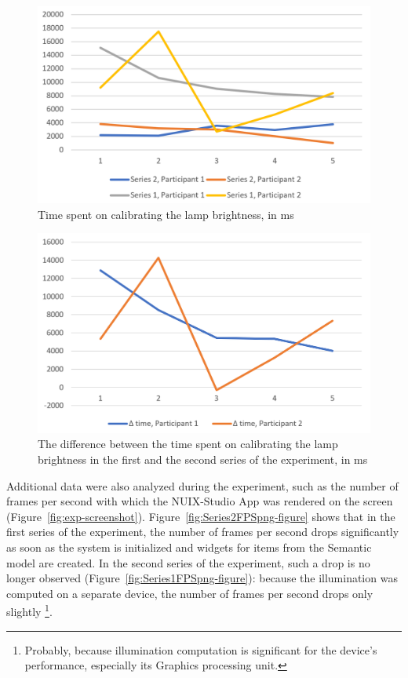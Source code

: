 \begin{figure}
  \centering
  \includegraphics[width = 0.9 \linewidth]{figures/ExperimentTime.png}
  \caption{Time spent on calibrating the lamp brightness, in ms}
  \label{fig:ExperimentTime-figure}
\end{figure}


\begin{figure}
  \centering
  \includegraphics[width = 0.9 \linewidth]{figures/DeltaTime.png}
  \caption{The difference between the time spent on calibrating the lamp brightness in the first and the second series of the experiment, in ms}
  \label{fig:DeltaTime-figure}
\end{figure}

Additional data were also analyzed during the experiment, such as the number of frames per second with which the NUIX-Studio App was rendered on the screen (Figure~\ref{fig:exp-screenshot}). Figure~\ref{fig:Series2FPSpng-figure} shows that in the first series of the experiment, the number of frames per second drops significantly as soon as the system is initialized and widgets for items from the Semantic model are created. In the second series of the experiment, such a drop is no longer observed (Figure~\ref{fig:Series1FPSpng-figure}): because the illumination was computed on a separate device, the number of frames per second drops only slightly \footnote{Probably, because illumination computation is significant for the device's performance, especially its Graphics processing unit.}.

